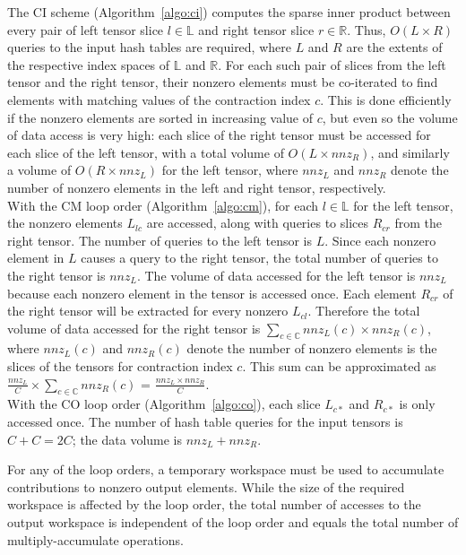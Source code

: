  The CI scheme (Algorithm~\ref{algo:ci}) computes the sparse inner product between every pair of left tensor slice $l \in  \mathbb{L}$ and right tensor slice  $r \in \mathbb{R}$. Thus, $O(L \times R)$ queries to the input hash tables are required, where $L$ and $R$ are the extents of the respective index spaces of $\mathbb{L}$ and $\mathbb{R}$. For each such pair of slices from the left tensor and the right tensor, their nonzero elements must be co-iterated to find elements with matching values of the contraction index $c$. This is done efficiently if the nonzero elements are sorted in increasing value of $c$, but even so the volume of data access is very high: each slice of the right tensor must be accessed for each slice of the left tensor, with a total volume of $O(L \times \mathit{nnz}_R)$, and similarly a volume of $O(R \times \mathit{nnz}_L)$ for the left tensor, where $\mathit{nnz}_L$ and $\mathit{nnz}_R$ denote the number of nonzero elements in the left and right tensor, respectively.\\
  With the CM loop order (Algorithm~\ref{algo:cm}), for each  $l \in  \mathbb{L}$ for the left tensor, the nonzero elements $L_{lc}$ are accessed, along with queries to slices $R_{cr}$ from the right tensor. The number of queries to the left tensor is $L$. Since each nonzero element in $L$ causes a query to the right tensor, the total number of queries to the right tensor is $\mathit{nnz}_L$. The volume of data accessed for the left tensor is $\mathit{nnz}_L$ because each nonzero element in the tensor is accessed once. Each element $R_{cr}$ of the right tensor will be extracted for every nonzero $L_{cl}$. Therefore the total volume of data accessed for the right tensor is $\sum_{c \in \mathbb{C}}{\mathit{nnz}_L(c) \times \mathit{nnz}_R(c)}$, where $\mathit{nnz}_L(c)$ and $\mathit{nnz}_R(c)$ denote the number of nonzero elements is the slices of the tensors for contraction index $c$. This sum can be approximated as $\frac{\mathit{nnz}_L}{C} \times \sum_{c \in \mathbb{C}} \mathit{nnz}_R(c)$ = $\frac{\mathit{nnz}_L \times \mathit{nnz}_R}{C}$.\\
 With the CO loop order (Algorithm~\ref{algo:co}), each slice $L_{c*}$ and $R_{c*}$ is only accessed once. The number of hash table queries for the input tensors is $C+C = 2C$; the data volume is $\mathit{nnz}_L + \mathit{nnz}_R$. 

 For any of the loop orders, a temporary workspace must be used to accumulate contributions to nonzero output elements. While the size of the required workspace is affected by the loop order, the total number of accesses to the output workspace is independent of the loop order and equals the total number of multiply-accumulate operations.

